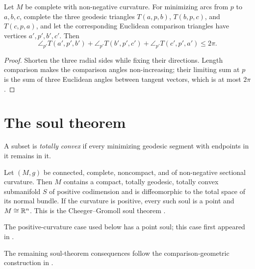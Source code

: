 \begin{corollary}
\label{cor:angle-comparison}
\label{anglecompar}

Let $M$ be complete with non-negative curvature. For minimizing arcs
from $p$ to $a,b,c$, complete the three geodesic triangles
$T(a,p,b)$, $T(b,p,c)$, and $T(c,p,a)$, and let the corresponding
Euclidean comparison triangles have vertices $a',p',b',c'$. Then
$$\angle_{p'}T(a',p',b')+\angle_{p'}T(b',p',c')
+\angle_{p'}T(c',p',a')\le2\pi.$$
\end{corollary}
\begin{proof}
\sketch
{}
Shorten the three radial sides while fixing their directions. Length
comparison makes the comparison angles non-increasing; their limiting
sum at $p$ is the sum of three Euclidean angles between tangent vectors,
which is at most $2\pi$.
\end{proof}

\section{The soul theorem}

A subset is \emph{totally convex} if every minimizing geodesic segment
with endpoints in it remains in it.

\begin{theorem}
\label{thm:soul-theorem}
\label{soul}

Let $(M,g)$ be connected, complete, noncompact, and of non-negative
sectional curvature. Then $M$ contains a compact, totally geodesic,
totally convex submanifold $S$ of positive codimension and is
diffeomorphic to the total space of its normal bundle. If the curvature
is positive, every such soul is a point and $M\cong\mathbb{R}^n$.
This is the Cheeger--Gromoll soul theorem
\cite{CheegerGromollbul,CheegerGromoll}.
\end{theorem}

\begin{remark}
\label{rem:soul-theorem-positive-curvature}

The positive-curvature case used below has a point soul; this case first
appeared in \cite{GromollMeyer}.
\end{remark}

The remaining soul-theorem consequences follow the comparison-geometric
construction in \cite{Petersen}.

